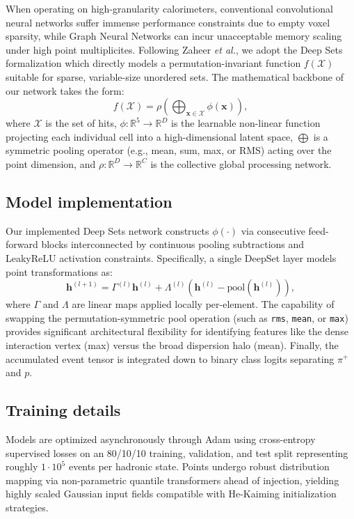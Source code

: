 \documentclass[11pt,a4paper]{article}
\newcommand{\etal}{\textit{et al.}\xspace}
\newcommand{\deepset}{Deep Sets\xspace}
\begin{document}
When operating on high-granularity calorimeters, conventional convolutional neural networks suffer immense performance constraints due to empty voxel sparsity, while Graph Neural Networks can incur unacceptable memory scaling under high point multiplicites.
Following Zaheer \etal \cite{zaheer2017deepsets}, we adopt the \deepset formalization which directly models a permutation-invariant function $f(\mathcal{X})$ suitable for sparse, variable-size unordered sets. 
The mathematical backbone of our network takes the form:
\begin{equation}
    f(\mathcal{X}) = \rho\left( \bigoplus_{\mathbf{x} \in \mathcal{X}} \phi(\mathbf{x}) \right),
\end{equation}
where $\mathcal{X}$ is the set of hits, $\phi: \mathbb{R}^5 \to \mathbb{R}^D$ is the learnable non-linear function projecting each individual cell into a high-dimensional latent space, $\bigoplus$ is a symmetric pooling operator (e.g., mean, sum, max, or RMS) acting over the point dimension, and $\rho: \mathbb{R}^D \to \mathbb{R}^C$ is the collective global processing network.

\subsection{Model implementation}
Our implemented \deepset network constructs $\phi(\cdot)$ via consecutive feed-forward blocks interconnected by continuous pooling subtractions and LeakyReLU activation constraints. Specifically, a single DeepSet layer models point transformations as:
\begin{equation}
    \mathbf{h}^{(l+1)} = \Gamma^{(l)} \mathbf{h}^{(l)} + \Lambda^{(l)} \left( \mathbf{h}^{(l)} - \text{pool}\left(\mathbf{h}^{(l)}\right) \right),
\end{equation}
where $\Gamma$ and $\Lambda$ are linear maps applied locally per-element. The capability of swapping the permutation-symmetric pool operation (such as \texttt{rms}, \texttt{mean}, or \texttt{max}) provides significant architectural flexibility for identifying features like the dense interaction vertex (max) versus the broad dispersion halo (mean). Finally, the accumulated event tensor is integrated down to binary class logits separating $\pi^+$ and $p$.

\subsection{Training details}
Models are optimized asynchronously through Adam using cross-entropy supervised losses on an 80/10/10 training, validation, and test split representing roughly $1 \cdot 10^5$ events per hadronic state. Points undergo robust distribution mapping via non-parametric quantile transformers ahead of injection, yielding highly scaled Gaussian input fields compatible with He-Kaiming initialization strategies.
\end{document}
